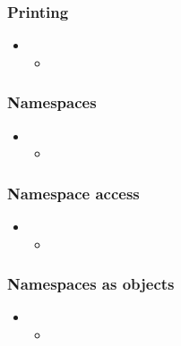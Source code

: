 %
%


\begin{frame}[fragile]
%
  \frametitle{Printing}
%
  \begin{itemize}
%
  \item 
    \begin{itemize}
    \item
    \end{itemize}
%
  \end{itemize}
%
\end{frame}

\begin{frame}[fragile]
%
  \frametitle{Namespaces}
%
  \begin{itemize}
%
  \item 
    \begin{itemize}
    \item
    \end{itemize}
%
  \end{itemize}
%
\end{frame}

\begin{frame}[fragile]
%
  \frametitle{Namespace access}
%
  \begin{itemize}
%
  \item 
    \begin{itemize}
    \item
    \end{itemize}
%
  \end{itemize}
%
\end{frame}

\begin{frame}[fragile]
%
  \frametitle{Namespaces as objects}
%
  \begin{itemize}
%
  \item 
    \begin{itemize}
    \item
    \end{itemize}
%
  \end{itemize}
%
\end{frame}

